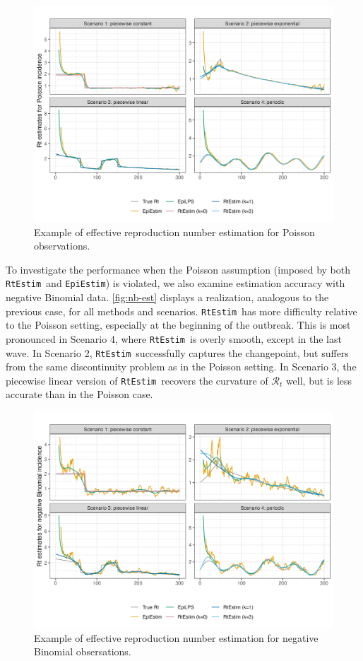 \documentclass[10pt,letterpaper]{article}
\def\RtEstim{\texttt{RtEstim}}
\def\EpiEstim{\texttt{EpiEstim}}
\def\calR{\mathcal{R}}
\begin{document}
\begin{figure}[!h]
  \centering
  \includegraphics[width=.99\textwidth]{fig/Pois-res-plot.png}
  \caption{Example of effective reproduction number estimation for Poisson observations.}
  \label{fig:pois-est}
\end{figure}

To investigate the performance when the Poisson assumption (imposed by both
\RtEstim\ and \EpiEstim) is violated, we also examine estimation accuracy with
negative Binomial data. \autoref{fig:nb-est} displays a realization, analogous
to the previous case, for all methods and scenarios. \RtEstim\ has more
difficulty relative to the Poisson setting, especially at the beginning of the
outbreak. This is most pronounced in Scenario 4, where \RtEstim\ is overly
smooth, except in the last wave. In Scenario 2, \RtEstim\ successfully captures
the changepoint, but suffers from the same discontinuity problem as in the
Poisson setting. In Scenario 3, the piecewise linear version of \RtEstim\
recovers the curvature of $\calR_t$ well, but is less accurate than in the
Poisson case.

\begin{figure}[!h]
  \centering
  \includegraphics*[width=.99\textwidth]{fig/NB-res-plot.png}
  \caption{Example of effective reproduction number estimation for negative
  Binomial obsersations.}
  \label{fig:nb-est}
\end{figure}
\end{document}
